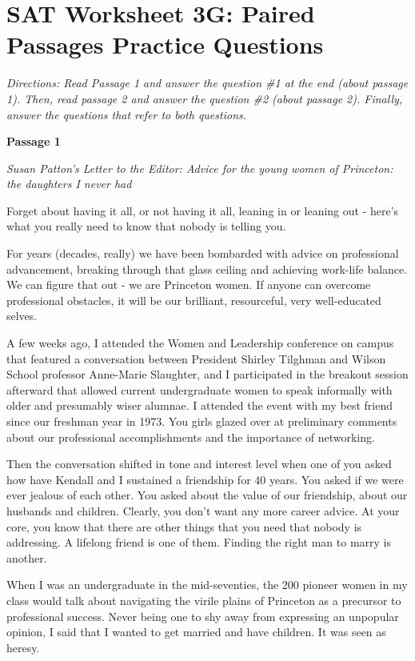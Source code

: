 \documentclass[12pt]{book}
\renewcommand{\indent}{\hspace{1cm}}
\begin{document}
\newpage
\section[Paired Passages]{SAT Worksheet 3G: Paired Passages Practice Questions}
\textit{Directions: Read Passage 1 and answer the question \#1 at the end (about passage 1). Then, read passage 2 and answer the question \#2 (about passage 2). Finally, answer the questions that refer to both questions. }

\bigskip
\textbf{Passage 1}

\textit{Susan Patton's Letter to the Editor: Advice for the young women of Princeton: the daughters I never had}

\bigskip
\begin{linenumbers*}
\modulolinenumbers[5]
\indent Forget about having it all, or not having it all, leaning in or leaning out - here's what you really need to know that nobody is telling you.

\indent For years (decades, really) we have been bombarded with advice on professional advancement, breaking through that glass ceiling and achieving work-life balance. We can figure that out - we are Princeton women. If anyone can overcome professional obstacles, it will be our brilliant, resourceful, very well-educated selves.

\indent A few weeks ago, I attended the Women and Leadership conference on campus that featured a conversation between President Shirley Tilghman and Wilson School professor Anne-Marie Slaughter, and I participated in the breakout session afterward that allowed current undergraduate women to speak informally with older and presumably wiser alumnae. I attended the event with my best friend since our freshman year in 1973. You girls glazed over at preliminary comments about our professional accomplishments and the importance of networking.

\indent Then the conversation shifted in tone and interest level when one of you asked how have Kendall and I sustained a friendship for 40 years. You asked if we were ever jealous of each other. You asked about the value of our friendship, about our husbands and children. Clearly, you don't want any more career advice. At your core, you know that there are other things that you need that nobody is addressing. A lifelong friend is one of them. Finding the right man to marry is another.

\indent When I was an undergraduate in the mid-seventies, the 200 pioneer women in my class would talk about navigating the virile plains of Princeton as a precursor to professional success. Never being one to shy away from expressing an unpopular opinion, I said that I wanted to get married and have children. It was seen as heresy.


\end{linenumbers*}
\end{document}
